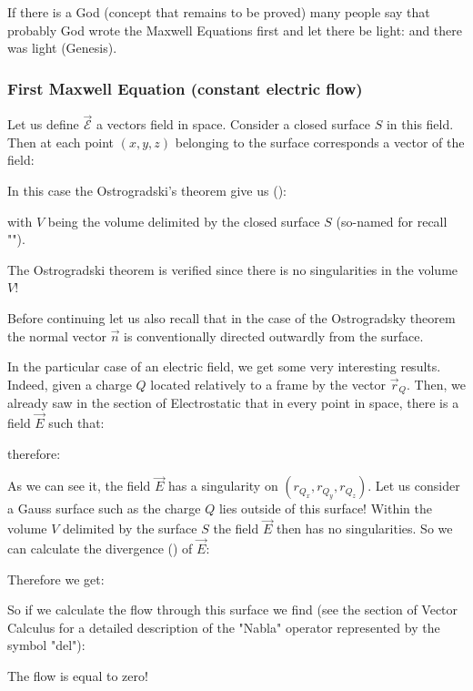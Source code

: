 	If there is a God (concept that remains to be proved) many people say that probably God wrote the Maxwell Equations first and let there be light: and there was light (Genesis).
	
	\subsubsection{First Maxwell Equation (constant electric flow)}\label{first maxwell equation}
	Let us define $\vec{\mathcal{E}}$ a vectors field in space. Consider a closed surface $S$ in this field. Then at each point $(x, y, z)$ belonging to the surface corresponds a vector of the field:
	
	In this case the Ostrogradski's theorem give us ():
	
	with $V$ being the volume delimited by the closed surface $S$ (so-named for recall "").
	\begin{tcolorbox}[title=Remark,colframe=black,arc=10pt]
	The Ostrogradski theorem is verified since there is no singularities in the volume $V$!
	\end{tcolorbox}
	Before continuing let us also recall that in the case of the Ostrogradsky theorem the normal vector $\vec{n}$ is conventionally directed outwardly from the surface.
	
	In the particular case of an electric field, we get some very interesting results. Indeed, given a charge $Q$ located relatively to a frame by the vector $\vec{r}_Q$. Then, we already saw in the section of Electrostatic that in every point in space, there is a field $\vec{E}$ such that:
	
	therefore:
	
	As we can see it, the field $\vec{E}$ has a singularity on $(r_{Q_x},r_{Q_y},r_{Q_z})$. Let us consider a Gauss surface such as the charge $Q$ lies outside of this surface! Within the volume $V$ delimited by the surface $S$ the field $\vec{E}$ then has no singularities. So we can calculate the divergence () of $\vec{E}$:
	
	Therefore we get:
	
	So if we calculate the flow through this surface we find (see the section of Vector Calculus for a detailed description of the "Nabla" operator represented by the symbol "del"):
	
	The flow is equal to zero!
	
